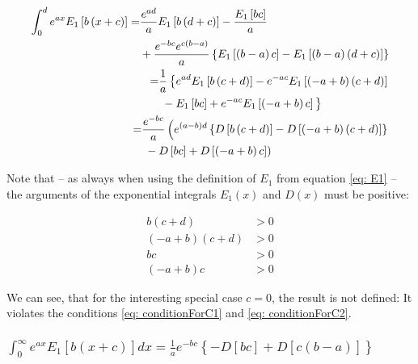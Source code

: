 \documentclass[bibliography=totocnumbered]{scrartcl}
\begin{document}
	\begin{align}
			\begin{split}
				\int_{0}^{d}e^{ax}E_1\left[b\left(x+c\right)\right]=&\frac{e^{ad}}{a}E_1\left[b\left(d+c\right)\right]-\frac{E_1\left[bc\right]}{a}\\
				&+\frac{e^{-bc}e^{c\left(b-a\right)}}{a}\left\{E_1\left[\left(b-a\right)c\right]-E_1\left[\left(b-a\right)\left(d+c\right)\right]\right\}
			\end{split}\\
			\begin{split}
				=&\frac{1}{a}\left\{e^{ad}E_1\left[b\left(c+d\right)\right]-e^{-ac}E_1\left[\left(-a+b\right)\left(c+d\right)\right]\right. \\
				&\left. {}-E_1\left[bc\right]+e^{-ac}E_1\left[\left(-a+b\right)c\right]\vphantom{e^{ad}}\right\}
			\end{split}\\
			\begin{split}
				=&\frac{e^{-bc}}{a}\left(e^{\left(a-b\right)d}\left\{D\left[b\left(c+d\right)\right]-D\left[\left(-a+b\right)\left(c+d\right)\right]\right\}\right.\\
				&\left. {}-D\left[bc\right]+D\left[\left(-a+b\right)c\right]\right)\label{eq: generalIntegralOfE1}
			\end{split}
	\end{align}
	
	Note that -- as always when using the definition of $E_1$ from equation \eqref{eq: E1}  -- the arguments of the exponential integrals $E_1\left(x\right)$ and $D\left(x\right)$ must be positive:
	
	\begin{subequations}
	\begin{align}
		b\left(c+d\right)&>0\\
		\left(-a+b\right)\left(c+d\right)&>0\\
		bc&>0\label{eq: conditionForC1}\\
		\left(-a+b\right)c&>0\label{eq: conditionForC2}
	\end{align}
	\end{subequations}
	
	We can see, that for the interesting special case $c=0$, the result is not defined: It violates the conditions \eqref{eq: conditionForC1} and \eqref{eq: conditionForC2}.
	
	\subsubsection[A integral of E1, involving the exponential function]{$\int_{0}^{\infty}e^{ax}E_1\left[b\left(x+c\right)\right]dx=\frac{1}{a}e^{-bc}\left\{-D\left[bc\right]+D\left[c\left(b-a\right)\right]\right\}$}
	\label{subsubsec: generalIntegralOfE2}
	
\end{document}
